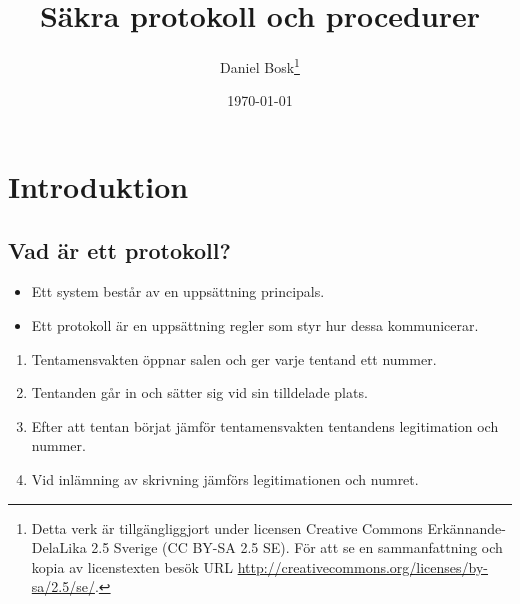 \documentclass{beamer}
\title[Säkra protokoll]{%
  Säkra protokoll och procedurer
}
\author[D.~Bosk]{Daniel Bosk\footnote{%
  Detta verk är tillgängliggjort under licensen Creative Commons 
  Erkännande-DelaLika 2.5 Sverige (CC BY-SA 2.5 SE).
	För att se en sammanfattning och kopia av licenstexten besök URL 
	\url{http://creativecommons.org/licenses/by-sa/2.5/se/}.
}}
\institute[MIUN IKS]{%
  Avdelningen för informations- och kommunikationssytem (IKS),\\
  Mittuniversitetet, Sundsvall.
}
\date{\today}
\theoremstyle{definition}
\theoremstyle{remark}
\begin{document}
\begin{frame}
  \titlepage{}
\end{frame}





\section{Introduktion}

\subsection{Vad är ett protokoll?}

\begin{frame}
  \begin{definition}[Protokoll]
    \begin{itemize}
      \item Ett system består av en uppsättning principals.
      \item Ett protokoll är en uppsättning regler som styr hur dessa 
        kommunicerar.
    \end{itemize}
  \end{definition}

  \pause{}

  \begin{example}
    \begin{enumerate}
      \item Tentamensvakten öppnar salen och ger varje tentand ett nummer.
      \item Tentanden går in och sätter sig vid sin tilldelade plats.
      \item Efter att tentan börjat jämför tentamensvakten tentandens 
        legitimation och nummer.
      \item Vid inlämning av skrivning jämförs legitimationen och numret.
    \end{enumerate}
  \end{example}
\end{frame}
\end{document}
